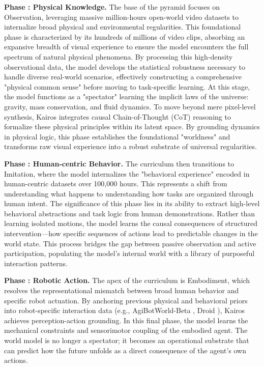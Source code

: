 \textbf{Phase \uppercase\expandafter{}: Physical Knowledge.} 
The base of the pyramid focuses on Observation, leveraging massive million-hours open-world video datasets to internalize broad physical and environmental regularities. This foundational phase is characterized by its hundreds of millions of video clips, absorbing an expansive breadth of visual experience to ensure the model encounters the full spectrum of natural physical phenomena. By processing this high-density observational data, the model develops the statistical robustness necessary to handle diverse real-world scenarios, effectively constructing a comprehensive "physical common sense" before moving to task-specific learning. At this stage, the model functions as a "spectator" learning the implicit laws of the universe: gravity, mass conservation, and fluid dynamics. To move beyond mere pixel-level synthesis, Kairos integrates causal Chain-of-Thought (CoT) reasoning to formalize these physical principles within its latent space. By grounding dynamics in physical logic, this phase establishes the foundational "worldness" and transforms raw visual experience into a robust substrate of universal regularities.




\textbf{Phase \uppercase\expandafter{}: Human-centric Behavior.}
The curriculum then transitions to Imitation, where the model internalizes the "behavioral experience" encoded in human-centric datasets over 100,000 hours. This represents a shift from understanding what happens to understanding how tasks are organized through human intent. The significance of this phase lies in its ability to extract high-level behavioral abstractions and task logic from human demonstrations. Rather than learning isolated motions, the model learns the causal consequences of structured intervention—how specific sequences of actions lead to predictable changes in the world state. This process bridges the gap between passive observation and active participation, populating the model’s internal world with a library of purposeful interaction patterns.




\textbf{Phase \uppercase\expandafter{}: Robotic Action.}
The apex of the curriculum is Embodiment, which resolves the representational mismatch between broad human behavior and specific robot actuation. By anchoring previous physical and behavioral priors into robot-specific interaction data (e.g., AgiBotWorld-Beta  \cite{AgiBotWorldContributors2025AgiBotWC}, Droid \cite{khazatsky2024droid}), Kairos achieves perception-action grounding. In this final phase, the model learns the mechanical constraints and sensorimotor coupling of the embodied agent. The world model is no longer a spectator; it becomes an operational substrate that can predict how the future unfolds as a direct consequence of the agent's own actions. 

